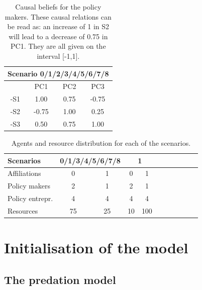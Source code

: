 \documentclass[12pt]{article}
\begin{document}
\begin{table}[h!]
\begin{center}
\begin{tabular}{ |c|c|c|c|}
\hline
\multicolumn{4}{|c|}{ {\bfseries Scenario 0/1/2/3/4/5/6/7/8}}	
								\\ \hline \hline
	& PC1	& PC2	& PC3		\\ \hline
-S1 	& 1.00	& 0.75	&-0.75		\\ \hline
-S2 	&-0.75	& 1.00	& 0.25 		\\ \hline
-S3 	& 0.50	& 0.75	& 1.00		\\ 
\hline
\end{tabular}
\end{center}
\caption{Causal beliefs for the policy makers. These causal relations can be read as: an increase of 1 in S2 will lead to a decrease of 0.75 in PC1. They are all given on the interval [-1,1].}
\label{tab:causalBeliefs}
\end{table}

\begin{table}[h!]
\begin{center}
\begin{tabular}{ |l||c|c||c|c||c|c||c|c||c|c| } 
\hline
 {\bfseries Scenarios}
 				& \multicolumn{2}{|c||}{ {\bfseries 0/1/3/4/5/6/7/8}}	
						& \multicolumn{2}{|c||}{ {\bfseries 1}}	
														\\ \hline \hline
Affiliations			& 0	& 1	& 0	& 1		\\ \hline
Policy makers 		& 2	& 1	& 2	& 1		\\ \hline
Policy entrepr.		& 4	& 4	& 4	& 4		\\ \hline
Resources		& 75	& 25	& 10	& 100	\\ \hline
\end{tabular}
\end{center}
\caption{Agents and resource distribution for each of the scenarios.}
\label{tab:agentResourceDistribution}
\end{table}


\section{Initialisation of the model}
\label{sec:initialisation}

\subsection{The predation model}
\end{document}
